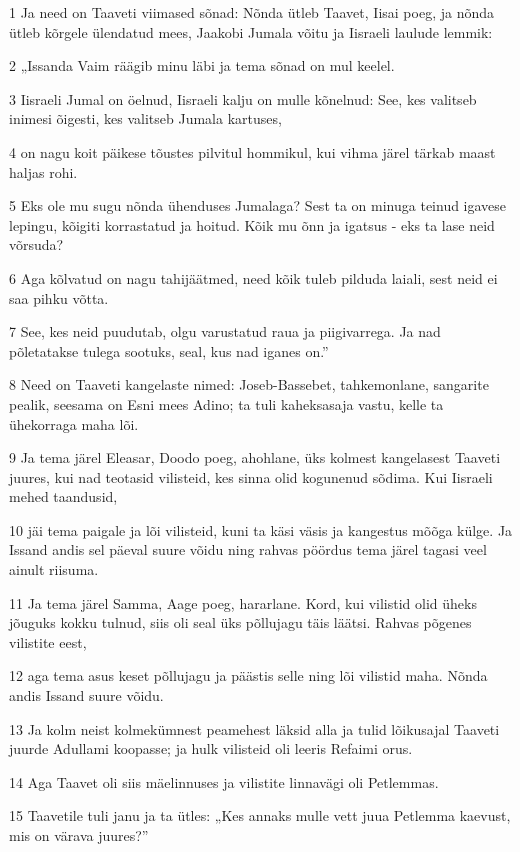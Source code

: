 \par 1 Ja need on Taaveti viimased sõnad: Nõnda ütleb Taavet, Iisai poeg, ja nõnda ütleb kõrgele ülendatud mees, Jaakobi Jumala võitu ja Iisraeli laulude lemmik:
\par 2 „Issanda Vaim räägib minu läbi ja tema sõnad on mul keelel.
\par 3 Iisraeli Jumal on öelnud, Iisraeli kalju on mulle kõnelnud: See, kes valitseb inimesi õigesti, kes valitseb Jumala kartuses,
\par 4 on nagu koit päikese tõustes pilvitul hommikul, kui vihma järel tärkab maast haljas rohi.
\par 5 Eks ole mu sugu nõnda ühenduses Jumalaga? Sest ta on minuga teinud igavese lepingu, kõigiti korrastatud ja hoitud. Kõik mu õnn ja igatsus - eks ta lase neid võrsuda?
\par 6 Aga kõlvatud on nagu tahijäätmed, need kõik tuleb pilduda laiali, sest neid ei saa pihku võtta.
\par 7 See, kes neid puudutab, olgu varustatud raua ja piigivarrega. Ja nad põletatakse tulega sootuks, seal, kus nad iganes on.”
\par 8 Need on Taaveti kangelaste nimed: Joseb-Bassebet, tahkemonlane, sangarite pealik, seesama on Esni mees Adino; ta tuli kaheksasaja vastu, kelle ta ühekorraga maha lõi.
\par 9 Ja tema järel Eleasar, Doodo poeg, ahohlane, üks kolmest kangelasest Taaveti juures, kui nad teotasid vilisteid, kes sinna olid kogunenud sõdima. Kui Iisraeli mehed taandusid,
\par 10 jäi tema paigale ja lõi vilisteid, kuni ta käsi väsis ja kangestus mõõga külge. Ja Issand andis sel päeval suure võidu ning rahvas pöördus tema järel tagasi veel ainult riisuma.
\par 11 Ja tema järel Samma, Aage poeg, hararlane. Kord, kui vilistid olid üheks jõuguks kokku tulnud, siis oli seal üks põllujagu täis läätsi. Rahvas põgenes vilistite eest,
\par 12 aga tema asus keset põllujagu ja päästis selle ning lõi vilistid maha. Nõnda andis Issand suure võidu.
\par 13 Ja kolm neist kolmekümnest peamehest läksid alla ja tulid lõikusajal Taaveti juurde Adullami koopasse; ja hulk vilisteid oli leeris Refaimi orus.
\par 14 Aga Taavet oli siis mäelinnuses ja vilistite linnavägi oli Petlemmas.
\par 15 Taavetile tuli janu ja ta ütles: „Kes annaks mulle vett juua Petlemma kaevust, mis on värava juures?”
